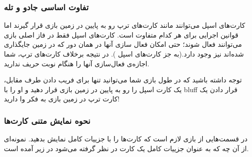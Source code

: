 \documentclass[]{article}
\begin{document}
\subsubsection*{{\titr تفاوت اساسی جادو و تله}}


کارت‌های اسپل می‌توانند مانند کارت‌های ترپ رو به پایین در زمین بازی قرار گیرند اما قوانین اجرایی برای هر کدام متفاوت است. کارت‌های اسپل فقط در فاز اصلی بازی می‌توانند فعال شوند؛ حتی امکان فعال سازی آنها در همان دور که در زمین جایگذاری شده‌اند نیز وجود دارد.(به جز کارت‌های اسپل ). در نتیجه  برخلاف کارت‌های ترپ، شما اجازه‌ی فعال‌سازی آنها را هنگام نوبت حریف ندارید.


توجه داشته باشید که در طول بازی شما می‌توانید تنها برای فریب دادن طرف مقابل، یک کارت اسپل را رو به پایین در زمین بازی قرار دهید و او را با bluff قرار دادن یک کارت ترپ در زمین بازی به فکر وا دارید!



\subsubsection*{{\titr نحوه نمایش متنی کارت‌ها}}

در قسمت‌هایی از بازی لازم است که کارت‌ها را با جزییات کامل نمایش بدهید. نمونه‌ای از آن چه که به عنوان جزییات کامل یک کارت در نظر گرفته می‌شود در زیر آمده است.
\end{document}
